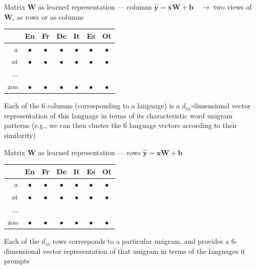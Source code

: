 \documentclass[12pt,aspectratio=169,handout]{beamer}
\begin{document}
\begin{frame}{Matrix $\bm{W}$ as learned representation --- columns}
$\bm{\hat{y}} = \bm{x} \bm{W} + \bm{b} \quad \to$ two views of $\bm{W}$, as rows or as columns

\begin{tabular}{r|cccccc}
& En & Fr & De & It & Es & Ot \\ \midrule
a & $\bullet$ & $\bullet$ & $\bullet$ & $\bullet$ & $\bullet$ & $\bullet$ \\
at & $\bullet$ & $\bullet$ & $\bullet$ & $\bullet$ & $\bullet$ & $\bullet$ \\
... & & & & & & \\
zoo & $\bullet$ & $\bullet$ & $\bullet$ & $\bullet$ & $\bullet$ & $\bullet$ \\
\end{tabular}

\pause
Each of the 6 columns (corresponding to a language) is a $d_{in}$-dimensional vector representation of this language in terms of its characteristic word unigram patterns (e.g., we can then cluster the 6 language vectors according to their similarity)


\end{frame}

\begin{frame}{Matrix $\bm{W}$ as learned representation --- rows}
$\bm{\hat{y}} = \bm{x} \bm{W} + \bm{b}$

\begin{tabular}{r|cccccc}
	& En & Fr & De & It & Es & Ot \\ \midrule
	a & $\bullet$ & $\bullet$ & $\bullet$ & $\bullet$ & $\bullet$ & $\bullet$ \\
	at & $\bullet$ & $\bullet$ & $\bullet$ & $\bullet$ & $\bullet$ & $\bullet$ \\
	... & & & & & & \\
	zoo & $\bullet$ & $\bullet$ & $\bullet$ & $\bullet$ & $\bullet$ & $\bullet$ \\
\end{tabular}

Each of the $d_{in}$ rows corresponds to a particular unigram, and provides a 6-dimensional vector
representation of that unigram in terms of the languages it prompts
	
\end{frame}
\end{document}
